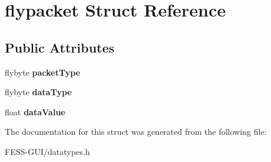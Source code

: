 \hypertarget{structflypacket}{}\section{flypacket Struct Reference}
\label{structflypacket}
\subsection*{Public Attributes}
\begin{DoxyCompactItemize}
\item 
\hypertarget{structflypacket_a1c430b5e9b74fe1822f09c23ac3ffca9}{}\label{structflypacket_a1c430b5e9b74fe1822f09c23ac3ffca9} 
flybyte {\bfseries packet\+Type}
\item 
\hypertarget{structflypacket_a9b4d29c0e457223adfedc0ce82117f49}{}\label{structflypacket_a9b4d29c0e457223adfedc0ce82117f49} 
flybyte {\bfseries data\+Type}
\item 
\hypertarget{structflypacket_a6e6310660096115b4360c9d392281463}{}\label{structflypacket_a6e6310660096115b4360c9d392281463} 
float {\bfseries data\+Value}
\end{DoxyCompactItemize}


The documentation for this struct was generated from the following file\+:\begin{DoxyCompactItemize}
\item 
F\+E\+S\+S-\/\+G\+U\+I/datatypes.\+h\end{DoxyCompactItemize}

